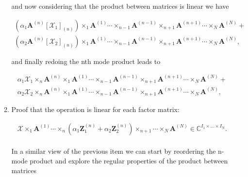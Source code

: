 \documentclass[a4paper,10pt]{article}
\begin{document}
\begin{enumerate}
\begin{enumerate}
                and now considering that the product between matrices is linear we have
                
                \begin{align}
                    \left(\alpha_{1} \boldsymbol{A}^{(n)} \left[\mathcal{X}_{1}\right]_{(n)}\right) \times_{1} \boldsymbol{A}^{(1)} \cdots \times_{n-1} \boldsymbol{A}^{(n-1)} \times_{n+1} \boldsymbol{A}^{(n+1)} \cdots \times_{N} \boldsymbol{A}^{(N)} + \\ 
                    \left(\alpha_{2} \boldsymbol{A}^{(n)} \left[\mathcal{X}_{2}\right]_{(n)}\right)  \times_{1} \boldsymbol{A}^{(1)} \cdots \times_{n-1} \boldsymbol{A}^{(n-1)} \times_{n+1} \boldsymbol{A}^{(n+1)} \cdots \times_{N} \boldsymbol{A}^{(N)},
                \end{align}
                
                and finally redoing the nth mode product leads to
                
                \begin{align}
                    \alpha_{1} \mathcal{X}_{1} \times_{n} \boldsymbol{A}^{(n)} \times_{1} \boldsymbol{A}^{(1)} \cdots \times_{n-1} \boldsymbol{A}^{(n-1)} \times_{n+1} \boldsymbol{A}^{(n+1)} \cdots \times_{N} \boldsymbol{A}^{(N)} + \\ 
                    \alpha_{2} \mathcal{X}_{2} \times_{n} \boldsymbol{A}^{(n)} \times_{1} \boldsymbol{A}^{(1)} \cdots \times_{n-1} \boldsymbol{A}^{(n-1)} \times_{n+1} \boldsymbol{A}^{(n+1)} \cdots \times_{N} \boldsymbol{A}^{(N)},
                \end{align}
                
            \item Proof that the operation is linear for each factor matrix: 
                
                \begin{align}
                    \mathcal{X} \times_{1} \boldsymbol{A}^{(1)} \cdots \times_{n} (\alpha_{1} \boldsymbol{Z}^{(n)}_{1} + \alpha_{2} \boldsymbol{Z}^{(n)}_{2}) \times_{n+1} \cdots \times_{N} \boldsymbol{A}^{(N)} \in \mathbb{C}^{I_{1} \times ... \times I_{N}}.
                \end{align}
                
                \paragraph{}In a similar view of the previous item we can start by reordering the n-mode product and explore the regular properties of the product between matrices
                

\end{enumerate}
\end{enumerate}
\end{document}
